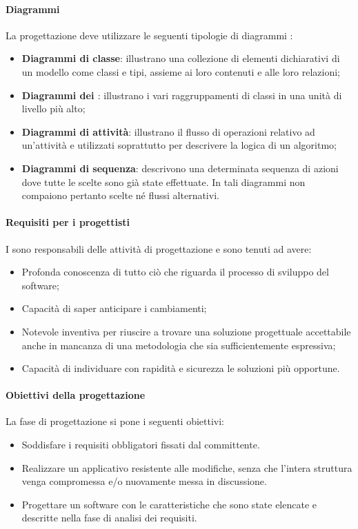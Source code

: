 \paragraph{Diagrammi}
La progettazione deve utilizzare le seguenti tipologie di diagrammi :
\begin{itemize}
\item
\textbf{Diagrammi di classe}: illustrano una collezione di elementi dichiarativi di un modello come classi e tipi, assieme ai loro contenuti e alle loro relazioni;
\item
\textbf{Diagrammi dei \textit{}}: illustrano i vari raggruppamenti di classi in una unità di livello più alto;
\item
\textbf{Diagrammi di attività}: illustrano il flusso di operazioni relativo ad un'attività e utilizzati soprattutto per descrivere la logica di un algoritmo;
\item
\textbf{Diagrammi di sequenza}: descrivono una determinata sequenza di azioni dove tutte le scelte sono già state effettuate. In tali diagrammi non compaiono pertanto scelte né flussi alternativi.
\end{itemize}

\paragraph{Requisiti per i progettisti}
I \textit{\ProgP} sono responsabili delle attività di progettazione e sono tenuti ad avere:
\begin{itemize}
\item
Profonda conoscenza di tutto ciò che riguarda il processo di sviluppo del software;
\item
Capacità di saper anticipare i cambiamenti;
\item
Notevole inventiva per riuscire a trovare una soluzione progettuale accettabile anche in mancanza di una metodologia che sia sufficientemente espressiva;
\item
Capacità di individuare con rapidità e sicurezza le soluzioni più opportune.
\end{itemize}

\paragraph{Obiettivi della progettazione}
La fase di progettazione si pone i seguenti obiettivi:
\begin{itemize}
\item Soddisfare i requisiti obbligatori fissati dal committente.
\item Realizzare un applicativo  resistente alle modifiche, senza che l'intera struttura venga compromessa e/o nuovamente messa in discussione.
\item Progettare un software con le caratteristiche che sono state elencate e descritte nella fase di analisi dei requisiti.
\end{itemize}

